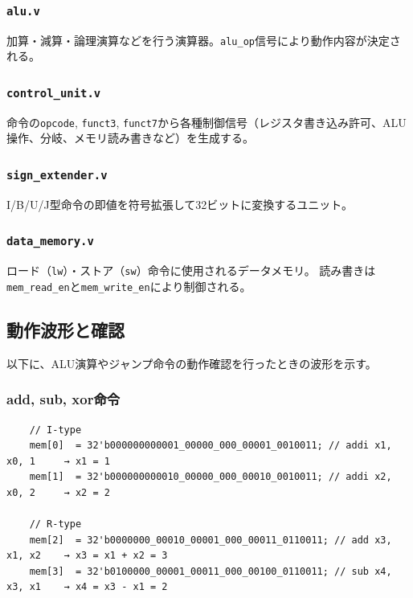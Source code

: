 \documentclass[a4paper, 11pt]{article}
\begin{document}


\subsubsection{\texttt{alu.v}}
加算・減算・論理演算などを行う演算器。\texttt{alu\_op}信号により動作内容が決定される。



\subsubsection{\texttt{control\_unit.v}}
命令の\texttt{opcode}, \texttt{funct3}, \texttt{funct7}から各種制御信号（レジスタ書き込み許可、ALU操作、分岐、メモリ読み書きなど）を生成する。



\subsubsection{\texttt{sign\_extender.v}}
I/B/U/J型命令の即値を符号拡張して32ビットに変換するユニット。



\subsubsection{\texttt{data\_memory.v}}
ロード（\texttt{lw}）・ストア（\texttt{sw}）命令に使用されるデータメモリ。
読み書きは\texttt{mem\_read\_en}と\texttt{mem\_write\_en}により制御される。



\subsection{動作波形と確認}
以下に、ALU演算やジャンプ命令の動作確認を行ったときの波形を示す。

\subsubsection{add, sub, xor命令}
\begin{lstlisting}
    // I-type
    mem[0]  = 32'b000000000001_00000_000_00001_0010011; // addi x1, x0, 1     → x1 = 1
    mem[1]  = 32'b000000000010_00000_000_00010_0010011; // addi x2, x0, 2     → x2 = 2

    // R-type
    mem[2]  = 32'b0000000_00010_00001_000_00011_0110011; // add x3, x1, x2    → x3 = x1 + x2 = 3
    mem[3]  = 32'b0100000_00001_00011_000_00100_0110011; // sub x4, x3, x1    → x4 = x3 - x1 = 2
\end{lstlisting}
\end{document}
